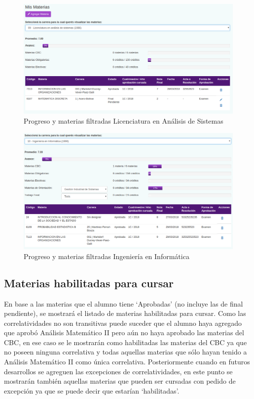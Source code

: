 \documentclass[a4paper]{article}
\begin{document}
\begin{figure}[H]
\centering
\includegraphics[scale=0.35]{Imagenes/progreso_licenciatura.png}\par
\caption{Progreso y materias filtradas Licenciatura en Análisis de Sistemas}
\end{figure}

\begin{figure}[H]
\centering
\includegraphics[scale=0.35]{Imagenes/progreso_informatica.png}\par
\caption{Progreso y materias filtradas Ingeniería en Informática}
\end{figure}

\subsection{Materias habilitadas para cursar}

En base a las materias que el alumno tiene `Aprobadas' (no incluye las de final pendiente), se mostrará el listado de materias habilitadas para cursar. Como las correlatividades no son transitivas puede suceder que el alumno haya agregado que aprobó Análisis Matemático II pero aún no haya aprobado las materias del CBC, en ese caso se le mostrarán como habilitadas las materias del CBC ya que no poseen ninguna correlativa y todas aquellas materias que sólo hayan tenido a Análisis Matemático II como única correlativa. Posteriormente cuando en futuros desarrollos se agreguen las excepciones de correlatividades, en este punto se mostrarán también aquellas materias que pueden ser cursadas con pedido de excepción ya que se puede decir que estarían `habilitadas'.
\end{document}
